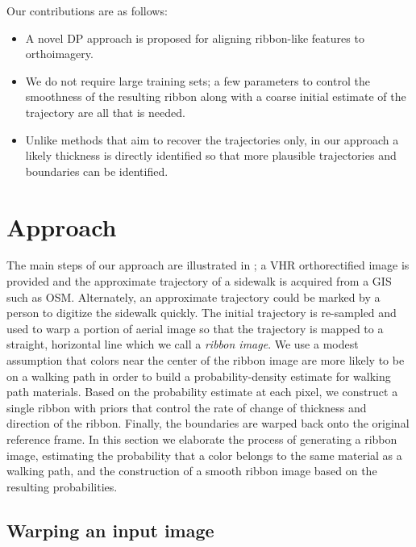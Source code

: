 Our contributions are as follows:
	\begin{itemize}
		\item A novel \ac{DP} approach is proposed for aligning ribbon-like features to orthoimagery.
		\item We do not require large training sets; a few parameters to control the smoothness of the resulting ribbon along with a coarse initial estimate of the trajectory are all that is needed. 
		\item Unlike methods that aim to recover the trajectories only, in our approach a likely thickness is directly identified so that more plausible trajectories and boundaries can be identified.
	\end{itemize}


\section{Approach} \label{sec:approach}

The main steps of our approach are illustrated in ; a \ac{VHR} orthorectified image is provided and the approximate trajectory of a sidewalk is acquired from a \ac{GIS} such as \ac{OSM}. Alternately, an approximate trajectory could be marked by a person to digitize the sidewalk quickly. The initial trajectory is re-sampled and used to warp a portion of aerial image so that the trajectory is mapped to a straight, horizontal line which we call a \textit{ribbon image}.  We use a modest assumption that colors near the center of the ribbon image are more likely to be on a walking path in order to build a probability-density estimate for walking path materials. Based on the probability estimate at each pixel, we construct a single ribbon with priors that control the rate of change of thickness and direction of the ribbon. Finally, the boundaries are warped back onto the original reference frame. In this section we elaborate the process of generating a ribbon image, estimating the probability that a color belongs to the same material as a walking path, and the construction of a smooth ribbon image based on the resulting probabilities. 



\subsection{Warping an input image}

